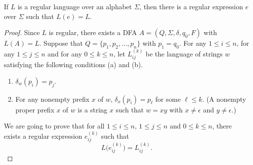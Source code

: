 \begin{lemma}
  If $L$ is a regular language over an alphabet $\Sigma$, then there is a
  regular expression $e$ over $\Sigma$ such that $L(e) = L$.
\end{lemma}
\begin{proof}
  Since $L$ is regular, there exists a DFA $A = (Q, \Sigma, \delta, q_0, F)$
  with $L(A) = L$.
  Suppose that $Q = \{p_1, p_2, \dots, p_n\}$ with $p_1 = q_0$.
  For any $1 \leq i \leq n$, for any $1 \leq j \leq n$ and for any
  $0 \leq k \leq n$, let $L_{ij}^{(k)}$ be the language of strings $w$
  satisfying the following conditions (a) and (b).
  \begin{enumerate}
    \item $\delta_w(p_i) = p_j$.
    \item For any nonempty prefix $x$ of $w$, $\delta_x(p_i) = p_\ell$ for some
    $\ell \leq k$.
    (A nonempty proper prefix $x$ of $w$ is a string $x$ such that $w = xy$
    with $x \neq \epsilon$ and $y \neq \epsilon$.)
  \end{enumerate}
  We are going to prove that for all $1 \leq i \leq n$, $1 \leq j \leq n$ and
  $0 \leq k \leq n$, there exists a regular expression $e_{ij}^{(k)}$
  such that
  \begin{equation*}
    L\bigl(e_{ij}^{(k)}\bigr) = L_{ij}^{(k)}.
  \end{equation*}


\end{proof}
